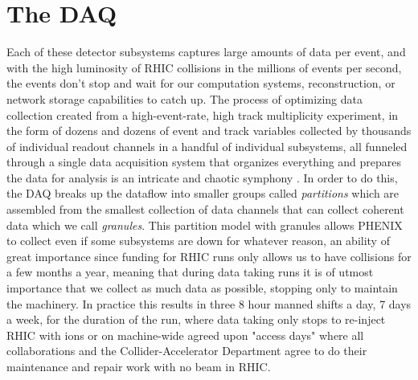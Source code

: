 \section{The DAQ}
Each of these detector subsystems captures large amounts of data per event, and with the high luminosity of RHIC collisions in the millions of events per second, the events don't stop and wait for our computation systems, reconstruction, or network storage capabilities to catch up. The process of optimizing data collection created from a high-event-rate, high track multiplicity experiment, in the form of dozens and dozens of event and track variables collected by thousands of individual readout channels in a handful of individual subsystems, all funneled through a single data acquisition system that organizes everything and prepares the data for analysis is an intricate and chaotic symphony \citep{DAQfocus}. In order to do this, the DAQ breaks up the dataflow into smaller groups called \textit{partitions} which are assembled from the smallest collection of data channels that can collect coherent data which we call \textit{granules}. This partition model with granules allows PHENIX to collect even if some subsystems are down for whatever reason, an ability of great importance since funding for RHIC runs only allows us to have collisions for a few months a year, meaning that during data taking runs it is of utmost importance that we collect as much data as possible, stopping only to maintain the machinery. In practice this results in three 8 hour manned shifts a day, 7 days a week, for the duration of the run, where data taking only stops to re-inject RHIC with ions or on machine-wide agreed upon "access days" where all collaborations and the Collider-Accelerator Department agree to do their maintenance and repair work with no beam in RHIC.

